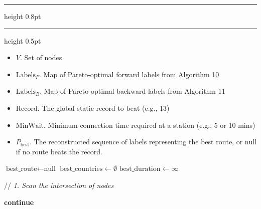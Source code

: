 \documentclass{article}
\newcommand{\CommentLine}[1]{
    \State // \textit{#1}
}
\begin{document}
\pagestyle{empty}
\allowdisplaybreaks[1] 
\setcounter{page}{1}


\setcounter{algorithm}{11}
\begin{center}
    \hrule height 0.8pt
    \vspace{0.3em}
    \label{alg:bidirectional_stitcher}
    \vspace{0.2em}
    \hrule height 0.5pt
\end{center}

\begin{algorithmic}[1] %
    
    \Input
    \begin{itemize}
        \item $V$. Set of nodes
        \item $\text{Labels}_F$. Map of Pareto-optimal forward labels from Algorithm 10
        \item $\text{Labels}_B$. Map of Pareto-optimal backward labels from Algorithm 11
        \item $\text{Record}$. The global static record to beat (e.g., 13)
        \item $\text{MinWait}$. Minimum connection time required at a station (e.g., 5 or 10 mins)
    \end{itemize}

    \Output
    \begin{itemize}
        \item $P_{\text{best}}$. The reconstructed sequence of labels representing the best route, or $\text{null}$ if no route beats the record.
    \end{itemize}
    \vspace{0.5em} 

    \State $\text{best\_route} \leftarrow \text{null}$
    \State $\text{best\_countries} \leftarrow \emptyset$
    \State $\text{best\_duration} \leftarrow \infty$

    \vspace{0.5em}
    \CommentLine{1. Scan the intersection of nodes}
            \State \textbf{continue} 
        \EndIf


\end{algorithmic}
\end{document}
